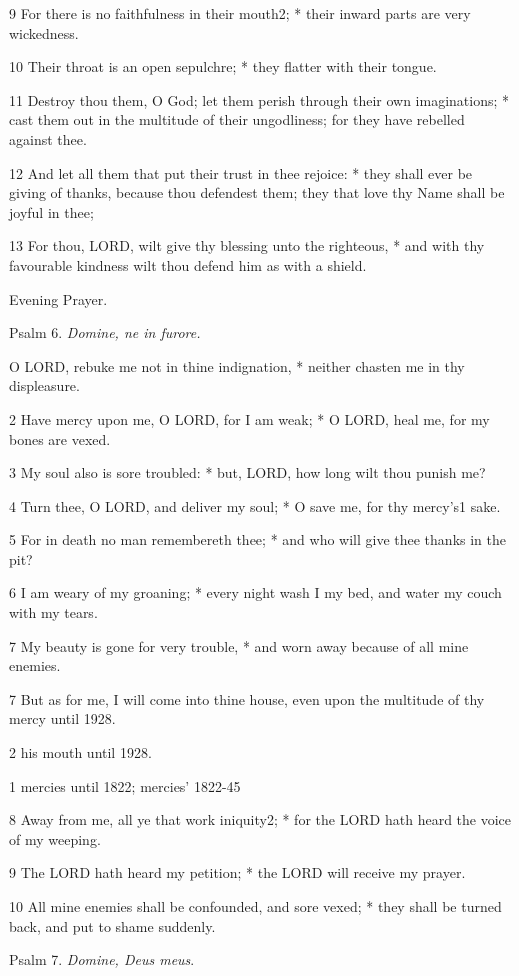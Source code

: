 9 For there is no faithfulness in their mouth2;
* their inward parts are very wickedness.

10 Their throat is an open sepulchre; * they flatter
with their tongue.

11 Destroy thou them, O God; let them perish through
their own imaginations; * cast them out in the multitude of their ungodliness;
for they have rebelled against thee.

12 And let all them that put their trust in thee rejoice:
* they shall ever be giving of thanks, because thou defendest them; they
that love thy Name shall be joyful in thee;

13 For thou, LORD, wilt give
thy blessing unto the righteous, * and with thy favourable kindness wilt
thou defend him as with a shield.

Evening
Prayer.

Psalm
6. \emph{Domine, ne in furore.}

O
LORD, rebuke me not in thine indignation, * neither chasten me in thy
displeasure.

2 Have mercy upon me, O LORD,
for I am weak; * O LORD, heal me, for my bones
are vexed.

3 My soul also is sore troubled: * but, LORD,
how long wilt thou punish me?

4 Turn thee, O LORD, and deliver
my soul; * O save me, for thy mercy's1 sake.

5 For in death no man remembereth thee; * and who will
give thee thanks in the pit?

6 I am weary of my groaning; * every night wash I my
bed, and water my couch with my tears.

7 My beauty is gone for very trouble, * and worn away
because of all mine enemies.

7 But as for me, I will come into thine
house, even upon the multitude of thy mercy until
1928.

2 his mouth until
1928.

1 mercies until
1822; mercies' 1822-45

8 Away from me, all ye that work iniquity2; * for the LORD
hath heard the voice of my weeping.

9 The LORD hath heard my petition;
* the LORD will receive my prayer.

10 All mine enemies shall be confounded, and sore vexed;
* they shall be turned back, and put to shame suddenly.

Psalm 7. \emph{Domine, Deus meus}.

